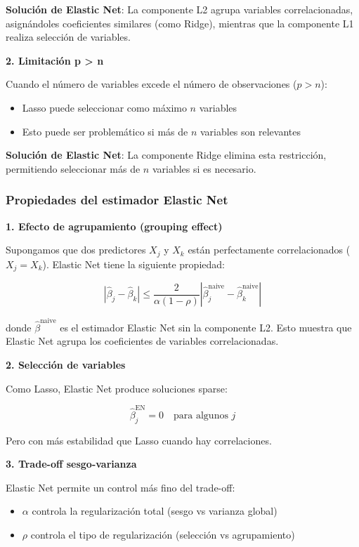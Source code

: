 \documentclass[
  doc,
  floatsintext,
  longtable,
  a4paper,
  nolmodern,
  notxfonts,
  notimes,
  12pt,
  colorlinks=true,linkcolor=blue,citecolor=blue,urlcolor=blue]{apa7}
\providecommand{\tightlist}{%
  \setlength{\itemsep}{0pt}\setlength{\parskip}{0pt}}
\begin{document}
\textbf{Solución de Elastic Net}: La componente L2 agrupa variables
correlacionadas, asignándoles coeficientes similares (como Ridge),
mientras que la componente L1 realiza selección de variables.

\textbf{2. Limitación p \textgreater{} n}

Cuando el número de variables excede el número de observaciones
(\(p > n\)):

\begin{itemize}
\tightlist
\item
  Lasso puede seleccionar como máximo \(n\) variables
\item
  Esto puede ser problemático si más de \(n\) variables son relevantes
\end{itemize}

\textbf{Solución de Elastic Net}: La componente Ridge elimina esta
restricción, permitiendo seleccionar más de \(n\) variables si es
necesario.

\subsubsection{Propiedades del estimador Elastic
Net}\label{propiedades-del-estimador-elastic-net}

\textbf{1. Efecto de agrupamiento (grouping effect)}

Supongamos que dos predictores \(X_j\) y \(X_k\) están perfectamente
correlacionados (\(X_j = X_k\)). Elastic Net tiene la siguiente
propiedad:

\[
|\hat{\beta}_j - \hat{\beta}_k| \leq \frac{2}{\alpha(1-\rho)} \left| \hat{\beta}_j^{\text{naive}} - \hat{\beta}_k^{\text{naive}} \right|
\]

donde \(\hat{\beta}^{\text{naive}}\) es el estimador Elastic Net sin la
componente L2. Esto muestra que Elastic Net agrupa los coeficientes de
variables correlacionadas.

\textbf{2. Selección de variables}

Como Lasso, Elastic Net produce soluciones sparse:

\[
\hat{\beta}_j^{\text{EN}} = 0 \quad \text{para algunos } j
\]

Pero con más estabilidad que Lasso cuando hay correlaciones.

\textbf{3. Trade-off sesgo-varianza}

Elastic Net permite un control más fino del trade-off:

\begin{itemize}
\tightlist
\item
  \(\alpha\) controla la regularización total (sesgo vs varianza global)
\item
  \(\rho\) controla el tipo de regularización (selección vs
  agrupamiento)
\end{itemize}
\end{document}
